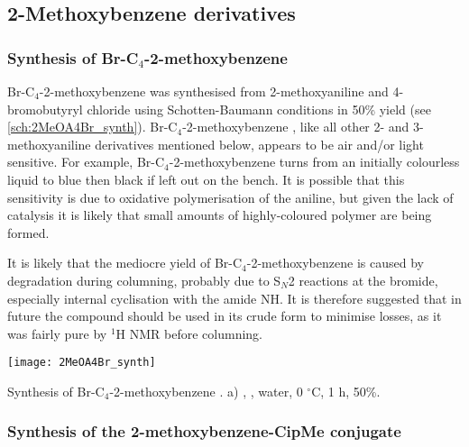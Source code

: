 
\subsection{2-Methoxybenzene derivatives\label{sec:2MeO}}

\subsubsection{Synthesis of Br-C$_4$-2-methoxybenzene }

Br-C$_4$-2-methoxybenzene  was synthesised from 2-methoxyaniline  and 4-bromobutyryl chloride  using Schotten-Baumann conditions in 50\% yield (see \ref{sch:2MeOA4Br_synth}). Br-C$_4$-2-methoxybenzene , like all other 2- and 3-methoxyaniline derivatives mentioned below, appears to be air and/or light sensitive.  For example, Br-C$_4$-2-methoxybenzene  turns from an initially colourless liquid to blue then black if left out on the bench. It is possible that this sensitivity is due to oxidative polymerisation of the aniline\cite{Mezhuev2017,Ragimov1997}, but given the lack of catalysis it is likely that small amounts of highly-coloured polymer are being formed.

It is likely that the mediocre yield of Br-C$_4$-2-methoxybenzene  is caused by degradation during columning, probably due to S$_N$2 reactions at the bromide, especially internal cyclisation with the amide NH. It is therefore suggested that in future the compound should be used in its crude form to minimise losses, as it was fairly pure by $^{1}$H NMR before columning.

\begin{scheme}[H]
	\begin{center}
		\texttt{[image: 2MeOA4Br\_synth]}
		\caption{Synthesis of Br-C$_4$-2-methoxybenzene .
		a) , , water, 0 $^{\circ}$C, 1 h, 50\%.
		\label{sch:2MeOA4Br_synth}}
	\end{center}
\end{scheme}

\subsubsection{Synthesis of the 2-methoxybenzene-CipMe conjugate }

